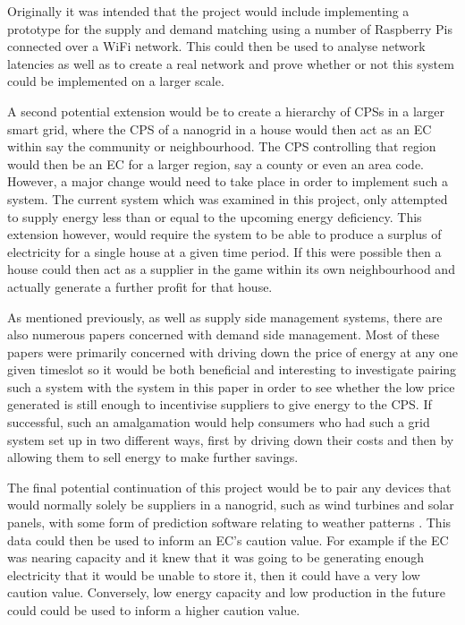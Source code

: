 \documentclass[a4paper, notitlepage]{report}
\begin{document}
Originally it was intended that the project would include implementing a
prototype for the supply and demand matching using a number of Raspberry Pis
connected over a WiFi network. This could then be used to analyse network
latencies as well as to create a real network and prove whether or not this
system could be implemented on a larger scale.

A second potential extension would be to create a hierarchy of CPSs in a larger
smart grid, where the CPS of a nanogrid in a house would then act as an EC
within say the community or neighbourhood. The CPS controlling that region would
then be an EC for a larger region, say a county or even an area code. However, a
major change would need to take place in order to implement such a system. The
current system which was examined in this project, only attempted to supply
energy less than or equal to the upcoming energy deficiency. This extension
however, would require the system to be able to produce a surplus of electricity
for a single house at a given time period. If this were possible then a house
could then act as a supplier in the game within its own neighbourhood and
actually generate a further profit for that house.

As mentioned previously, as well as supply side management systems, there are
also numerous papers concerned with demand side management. Most of these papers
were primarily concerned with driving down the price of energy at any one given
timeslot so it would be both beneficial and interesting to investigate pairing
such a system with the system in this paper in order to see whether the low
price generated is still enough to incentivise suppliers to give energy to the
CPS. If successful, such an amalgamation would help consumers who had such a
grid system set up in two different ways, first by driving down their costs and
then by allowing them to sell energy to make further savings.

The final potential continuation of this project would be to pair any devices
that would normally solely be suppliers in a nanogrid, such as wind turbines and
solar panels, with some form of prediction software relating to weather patterns
\cite{foley2012current}. This data could then be used to inform an EC’s caution
value. For example if the EC was nearing capacity and it knew that it was going
to be generating enough electricity that it would be unable to store it, then it
could have a very low caution value. Conversely, low energy capacity and low
production in the future could could be used to inform a higher caution value.

\printbibliography
\appendix
\end{document}
